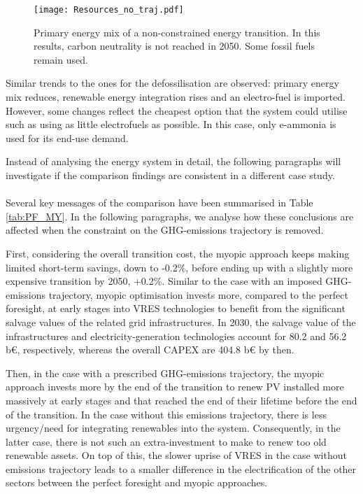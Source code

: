  \begin{figure}[!htbp]
\centering
\texttt{[image: Resources\_no\_traj.pdf]}
\caption{Primary energy mix of a non-constrained energy transition. In this results, carbon neutrality is not reached in 2050. Some fossil fuels remain used.}
\label{fig:EnergyMixPathwayWithoutGHGLimit}
\end{figure}

Similar trends to the ones for the defossilisation are observed: primary energy mix reduces, renewable energy integration rises and an electro-fuel is imported. However, some changes reflect the cheapest option that the system could utilise such as using as little electrofuels as possible. In this case, only e-ammonia is used for its end-use demand.

Instead of analysing the energy system in detail, the following paragraphs will investigate if the comparison findings are consistent in a different case study.\\

\\

\noindent
Several key messages of the comparison have been summarised in Table \ref{tab:PF_MY}. In the following paragraphs, we analyse how these conclusions are affected when the constraint on the \gls{GHG}-emissions trajectory is removed. 

First, considering the overall transition cost, the myopic approach keeps making limited short-term savings, \ie down to -0.2\%, before ending up with a slightly more expensive transition by 2050, \ie +0.2\%. Similar to the case with an imposed \gls{GHG}-emissions trajectory, myopic optimisation invests more, compared to the perfect foresight, at early stages into \gls{VRES} technologies to benefit from the significant salvage values of the related grid infrastructures. In 2030, the salvage value of the infrastructures and electricity-generation technologies account for 80.2 and 56.2 b€, respectively, whereas the overall CAPEX are 404.8 b€ by then.

Then, in the case with a prescribed \gls{GHG}-emissions trajectory, the myopic approach invests more by the end of the transition to renew \gls{PV} installed more massively at early stages and that reached the end of their lifetime before the end of the transition. In the case without this emissions trajectory, there is less urgency/need for integrating renewables into the system. Consequently, in the latter case, there is not such an extra-investment to make to renew too old renewable assets. On top of this, the slower uprise of \gls{VRES} in the case without emissions trajectory leads to a smaller difference in the electrification of the other sectors between the perfect foresight and myopic approaches.

